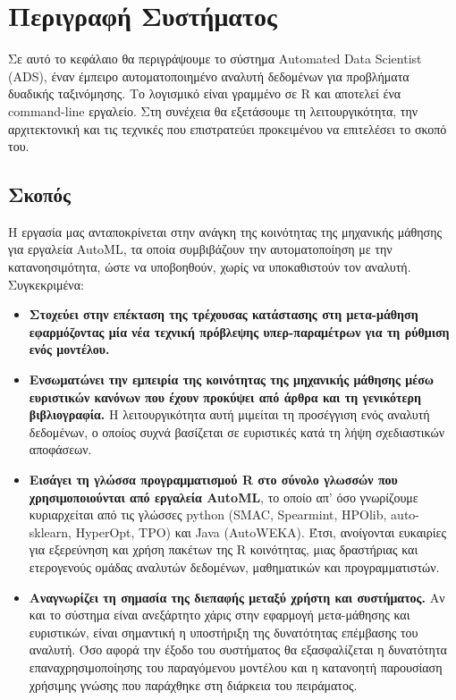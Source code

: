 \chapter{Περιγραφή Συστήματος}
Σε αυτό το κεφάλαιο θα περιγράψουμε το σύστημα Automated Data Scientist (ADS), έναν έμπειρο αυτοματοποιημένο αναλυτή δεδομένων για προβλήματα δυαδικής ταξινόμησης. Το λογισμικό είναι γραμμένο σε R και αποτελεί ένα command-line εργαλείο. Στη συνέχεια θα εξετάσουμε τη λειτουργικότητα, την αρχιτεκτονική και τις τεχνικές που επιστρατεύει προκειμένου να επιτελέσει το σκοπό του.
\section{Σκοπός}
Η εργασία μας ανταποκρίνεται στην ανάγκη της κοινότητας της μηχανικής μάθησης για εργαλεία AutoML, τα οποία συμβιβάζουν την αυτοματοποίηση με την κατανοησιμότητα, ώστε να υποβοηθούν, χωρίς να υποκαθιστούν τον αναλυτή. Συγκεκριμένα:
\begin{itemize}
	\item \textbf{Στοχεύει στην επέκταση της τρέχουσας κατάστασης στη μετα-μάθηση εφαρμόζοντας μία νέα τεχνική πρόβλεψης υπερ-παραμέτρων για τη ρύθμιση ενός μοντέλου.}
	\item  \textbf{Ενσωματώνει την εμπειρία της κοινότητας της μηχανικής μάθησης μέσω ευριστικών κανόνων που έχουν προκύψει από άρθρα και τη γενικότερη βιβλιογραφία.} Η λειτουργικότητα αυτή μιμείται τη προσέγγιση ενός αναλυτή δεδομένων, ο οποίος συχνά βασίζεται σε ευριστικές κατά τη λήψη σχεδιαστικών αποφάσεων.
	\item \textbf{Εισάγει τη γλώσσα προγραμματισμού R στο σύνολο γλωσσών που χρησιμοποιούνται από εργαλεία AutoML}, το οποίο απ' όσο γνωρίζουμε κυριαρχείται από τις γλώσσες python (SMAC, Spearmint, HPOlib, auto-sklearn, HyperOpt, TPO) και Java (AutoWEKA). Έτσι, ανοίγονται ευκαιρίες για εξερεύνηση και χρήση πακέτων της R κοινότητας, μιας δραστήριας και ετερογενούς ομάδας αναλυτών δεδομένων, μαθηματικών και προγραμματιστών.
	\item \textbf{Αναγνωρίζει τη σημασία της διεπαφής μεταξύ χρήστη και συστήματος.} Αν και το σύστημα είναι ανεξάρτητο χάρις στην εφαρμογή μετα-μάθησης και ευριστικών, είναι σημαντική η υποστήριξη της δυνατότητας επέμβασης του αναλυτή. Όσο αφορά την έξοδο του συστήματος θα εξασφαλίζεται η δυνατότητα επαναχρησιμοποίησης του παραγόμενου μοντέλου και η  κατανοητή παρουσίαση χρήσιμης γνώσης που παράχθηκε στη διάρκεια του πειράματος. 
\end{itemize} 

